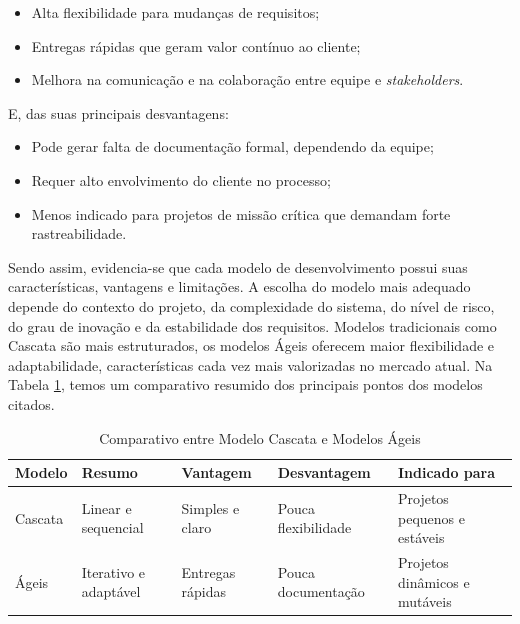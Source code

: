\documentclass[english,brazilian]{UNISINOSartigo} %
\begin{document}
\begin{itemize}[leftmargin=1cm, itemsep=0.1em, topsep=0.1em]
    \item Alta flexibilidade para mudanças de requisitos;
    \item Entregas rápidas que geram valor contínuo ao cliente;
    \item Melhora na comunicação e na colaboração entre equipe e \textit{stakeholders}.
\end{itemize}

E, das suas principais desvantagens:

\begin{itemize}[leftmargin=1cm, itemsep=0.1em, topsep=0.1em]
    \item Pode gerar falta de documentação formal, dependendo da equipe;
    \item Requer alto envolvimento do cliente no processo;
    \item Menos indicado para projetos de missão crítica que demandam forte rastreabilidade.
\end{itemize}

Sendo assim, evidencia-se que cada modelo de desenvolvimento possui suas características, vantagens e limitações. A escolha do modelo mais adequado depende do contexto do projeto, da complexidade do sistema, do nível de risco, do grau de inovação e da estabilidade dos requisitos. Modelos tradicionais como Cascata são mais estruturados, os modelos Ágeis oferecem maior flexibilidade e adaptabilidade, características cada vez mais valorizadas no mercado atual. Na Tabela \ref{tab:modelosDev}, temos um comparativo resumido dos principais pontos dos modelos citados.

\begin{table}[ht]
    \caption{Comparativo entre Modelo Cascata e Modelos Ágeis}
    \label{tab:modelosDev}
    \centering%
    \footnotesize
    \begin{tabularx}{\textwidth}{lXXXX}
        \toprule
        \textbf{Modelo} & \textbf{Resumo} & \textbf{Vantagem} & \textbf{Desvantagem} & \textbf{Indicado para}\\
        \midrule
        Cascata & Linear e sequencial & Simples e claro & Pouca flexibilidade & Projetos pequenos e estáveis \\
        \midrule
        Ágeis & Iterativo e adaptável & Entregas rápidas & Pouca documentação & Projetos dinâmicos e mutáveis \\
        \bottomrule
    \end{tabularx}
\end{table}
\FloatBarrier
\end{document}
